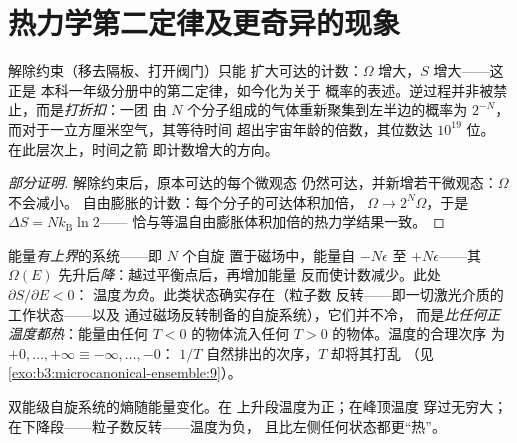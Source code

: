 \section{热力学第二定律及更奇异的现象}

\begin{proposition}[不可逆性即计数]\label{prop:b3:microcanonical-ensemble:second-law}
解除约束（移去隔板、打开阀门）只能
扩大可达的计数：$\Omega$ 增大，$S$ 增大——这正是
本科一年级分册中的第二定律，如今化为关于
概率的表述。逆过程并非被禁止，而是\emph{打折扣}：一团
由 $N$ 个分子组成的气体重新聚集到左半边的概率为
$2^{-N}$，而对于一立方厘米空气，其等待时间
超出宇宙年龄的倍数，其位数达 $10^{19}$ 位。
在此层次上，时间之箭
即计数增大的方向。
\end{proposition}

\begin{proof}[部分证明]
解除约束后，原本可达的每个微观态
仍然可达，并新增若干微观态：$\Omega$ 不会减小。
自由膨胀的计数：每个分子的可达体积加倍，
$\Omega \to 2^N\Omega$，于是 $\Delta S = Nk_{\text{B}}\ln2$——
恰与等温自由膨胀体积加倍的热力学结果一致。
\end{proof}

\begin{example}[负温度]\label{ex:b3:microcanonical-ensemble:negative}
能量\emph{有上界}的系统——即 $N$ 个自旋
置于磁场中，能量自 $-N\epsilon$ 至 $+N\epsilon$——其 $\Omega(E)$
先升后\emph{降}：越过平衡点后，再增加能量
反而使计数减少。此处 $\partial S/\partial E < 0$：
温度\emph{为负}。此类状态确实存在（粒子数
反转——即一切激光介质的工作状态——以及
通过磁场反转制备的自旋系统），它们并不冷，
而是\emph{比任何正温度都热}：能量由任何
$T < 0$ 的物体流入任何 $T > 0$ 的物体。温度的合理次序
为 $+0, \dots, +\infty \equiv -\infty, \dots, -0$：
$1/T$ 自然排出的次序，$T$ 却将其打乱
（见\cref{exo:b3:microcanonical-ensemble:9}）。
\end{example}

\begin{omfigure}

{\small 双能级自旋系统的熵随能量变化。在
上升段温度为正；在峰顶温度
穿过无穷大；在下降段——粒子数反转——温度为负，
且比左侧任何状态都更“热”。}
\end{omfigure}

